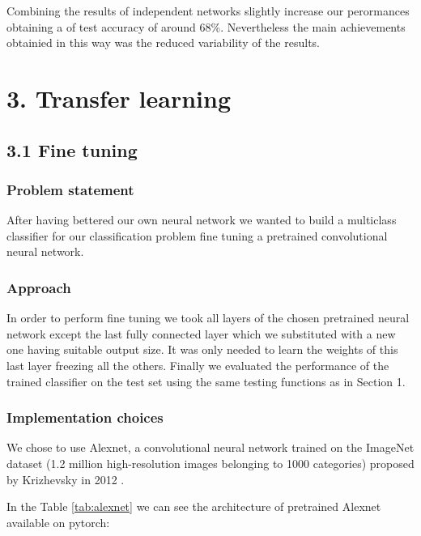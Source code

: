 \documentclass[12pt, a4paper]{report}
\begin{document}
Combining the results of independent networks slightly increase our perormances obtaining a of test accuracy of around 68\%. Nevertheless the main achievements obtainied in this way was the reduced variability of the results. 

\section*{3. Transfer learning}
\subsection*{3.1 Fine tuning}
\subsubsection*{Problem statement}

After having bettered our own neural network we wanted to build a multiclass classifier for our classification problem fine tuning a pretrained convolutional neural network.

\subsubsection*{Approach}
In order to perform fine tuning we took all layers of the chosen pretrained neural network except the last fully connected layer which we substituted with a new one having suitable output size. It was only needed to learn the weights of this last layer freezing all the others. Finally we evaluated the performance of the trained classifier on the test set using the same testing functions as in Section 1.

\subsubsection*{Implementation choices}
We chose to use Alexnet, a convolutional neural network trained on the ImageNet dataset (1.2 million high-resolution images belonging to 1000 categories) proposed by Krizhevsky in 2012 \cite{Krizhevsky}.

In the Table \ref{tab:alexnet} we can see the architecture of pretrained Alexnet available on pytorch:
\end{document}
